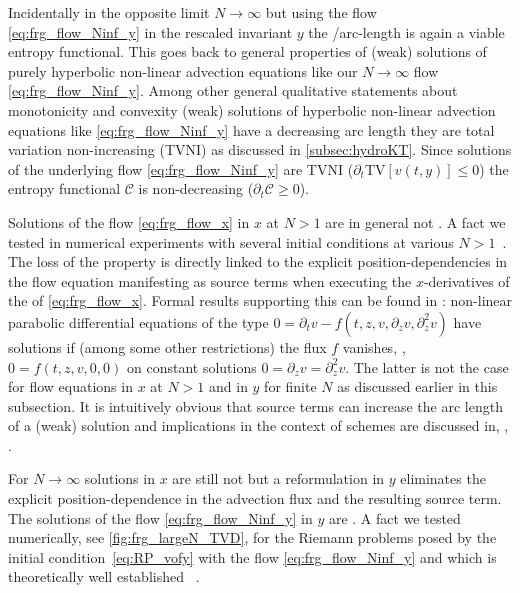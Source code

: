 Incidentally in the opposite limit $N\rightarrow\infty$ but using the flow \cref{eq:frg_flow_Ninf_y} in the rescaled invariant $y$ the \tv{}/arc-length is again a viable entropy functional.
This goes back to general properties of (weak) solutions of purely hyperbolic non-linear advection equations \dash{} like our $N\rightarrow\infty$ flow \cref{eq:frg_flow_Ninf_y}.
Among other general qualitative statements about monotonicity and convexity (weak) solutions of hyperbolic non-linear advection equations like \cref{eq:frg_flow_Ninf_y} have a decreasing arc length \dash{} they are total variation non-increasing (TVNI) as discussed in \cref{subsec:hydroKT}.
Since solutions of the underlying flow \cref{eq:frg_flow_Ninf_y} are TVNI ($\partial_t \mathrm{TV}[v(t,y)]\leq 0$) the entropy functional $\mathcal{C}$ is non-decreasing ($\partial_t\mathcal{C}\geq 0$).

Solutions of the flow \cref{eq:frg_flow_x} in $x$ at $N>1$ are in general not \tvni{}.
A fact we tested in numerical experiments with several initial conditions at various $N>1$~\cite{Koenigstein:2021syz,Koenigstein:2021rxj,Steil:2023zeroDlargeN,Steil:2023zeroDN1}.
The loss of the \tvni{} property is directly linked to the explicit position-dependencies in the flow equation manifesting as source terms when executing the $x$-derivatives of the \rhs{} of \cref{eq:frg_flow_x}.
Formal results supporting this can be found in : non-linear parabolic differential equations of the type $0=\partial_t v-f(t,z,v,\partial_z v,\partial_{z}^2 v)$ have \tvni{} solutions if (among some other restrictions) the flux $f$ vanishes, \ie{}, $0=f(t,z,v,0,0)$ on constant solutions $0=\partial_z v=\partial_{z}^2 v$.
The latter is not the case for flow equations in $x$ at $N>1$ and in $y$ for finite $N$ as discussed earlier in this subsection.
It is intuitively obvious that source terms can increase the arc length of a (weak) solution and implications in the context of \tvni{} schemes are discussed in, \eg{}, .

For $N \rightarrow \infty$ solutions in $x$ are still not \tvni{} but a reformulation in $y$ eliminates the explicit position-dependence in the advection flux and the resulting source term.
The solutions of the flow \cref{eq:frg_flow_Ninf_y} in $y$ are \tvni{}.
A fact we tested numerically, see \cref{fig:frg_largeN_TVD}, for the Riemann problems posed by the initial condition~\eqref{eq:RP_vofy} with the flow \cref{eq:frg_flow_Ninf_y} and which is theoretically well established \cf{}~.\bigskip

